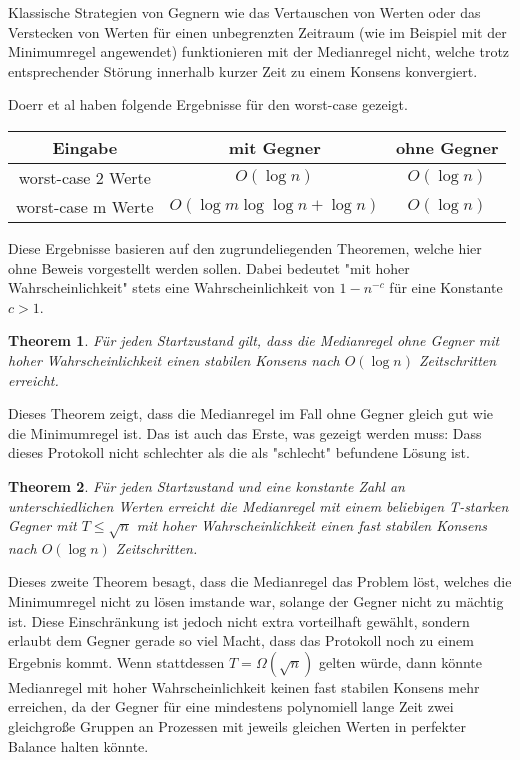 \documentclass[12pt,ngerman,a4paper]{scrartcl}
\theoremstyle{plain}
\newtheorem{theorem}{Theorem}
\theoremstyle{definition}
\theoremstyle{remark}
\begin{document}
Klassische Strategien von Gegnern wie das Vertauschen von Werten oder das
Verstecken von Werten für einen unbegrenzten Zeitraum (wie im Beispiel mit
der Minimumregel angewendet) funktionieren mit der Medianregel nicht, welche
trotz entsprechender Störung innerhalb kurzer Zeit zu einem Konsens konvergiert.

Doerr et al\cite{Doerr2011} haben folgende Ergebnisse für den worst-case gezeigt.

\begin{tabular}{c|c|c}
    Eingabe & mit Gegner & ohne Gegner\\
    \hline
    worst-case 2 Werte & \(O(\log n)\) & \(O(\log n)\) \\
    \hline
    worst-case m Werte & \(O(\log m \log \log n + \log n)\) & \(O(\log n)\)
\end{tabular}

Diese Ergebnisse basieren auf den zugrundeliegenden Theoremen, welche hier ohne
Beweis vorgestellt werden sollen. Dabei bedeutet "mit hoher Wahrscheinlichkeit"
stets eine Wahrscheinlichkeit von $1 - n^{-c}$ für eine Konstante $c > 1$.

\begin{theorem}
Für jeden Startzustand gilt, dass die Medianregel ohne Gegner mit hoher
Wahrscheinlichkeit einen stabilen Konsens nach $O(\log n)$ Zeitschritten
erreicht.
\end{theorem}

Dieses Theorem zeigt, dass die Medianregel im Fall ohne Gegner gleich gut wie
die Minimumregel ist. Das ist auch das Erste, was gezeigt werden muss: Dass dieses
Protokoll nicht schlechter als die als "schlecht" befundene Lösung ist.

\begin{theorem}
Für jeden Startzustand und eine konstante Zahl an unterschiedlichen Werten erreicht
die Medianregel mit einem beliebigen T-starken Gegner mit $T \leq \sqrt{n}$ mit
hoher Wahrscheinlichkeit einen fast stabilen Konsens nach $O(\log n)$
Zeitschritten.
\end{theorem}

Dieses zweite Theorem besagt, dass die Medianregel das Problem löst, welches
die Minimumregel nicht zu lösen imstande war, solange der Gegner nicht zu mächtig
ist. Diese Einschränkung ist jedoch nicht extra vorteilhaft gewählt, sondern
erlaubt dem Gegner gerade so viel Macht, dass das Protokoll noch zu einem
Ergebnis kommt. Wenn stattdessen $T = \Omega(\sqrt{n})$ gelten würde, dann könnte
Medianregel mit hoher Wahrscheinlichkeit keinen fast stabilen Konsens mehr
erreichen, da der Gegner für eine mindestens polynomiell lange Zeit zwei
gleichgroße Gruppen an Prozessen mit jeweils gleichen Werten in perfekter Balance
halten könnte.
\end{document}
